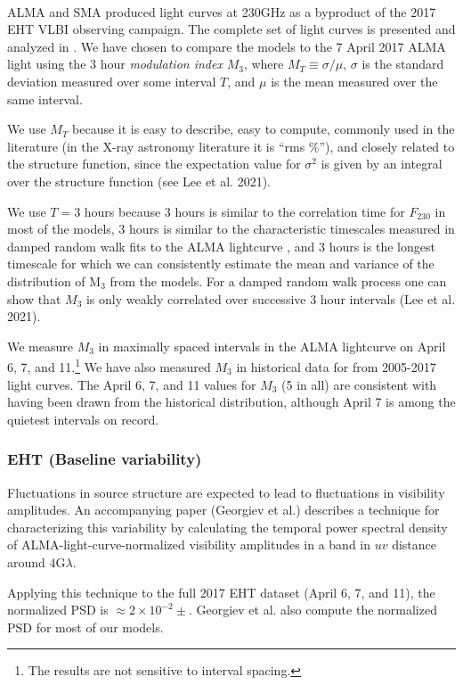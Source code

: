 \\
ALMA and SMA produced \sgra light curves at 230GHz as a byproduct of the 2017 EHT VLBI observing campaign. The complete set of light curves is presented and analyzed in \cite{wielgus2021}. We have chosen to compare the models to the 7 April 2017 ALMA light using
the 3 hour {\em modulation index} $M_3$, where $M_T \equiv
\sigma/\mu$, $\sigma$ is the standard deviation measured over some
interval $T$, and $\mu$ is the mean measured over the same interval.

We use $M_T$ because it is easy to describe, easy to compute, commonly used in the literature (in the X-ray astronomy literature it is ``rms \%''), and closely related to the structure function, since the expectation value for $\sigma^2$ is given by an integral over the structure function (see Lee et al. 2021).

We use $T = 3$ hours because 3 hours is similar to the correlation time for $F_{230}$ in most of the models, 3 hours is similar to the characteristic timescales measured in damped random walk fits to the ALMA lightcurve \citep[see Table 10 of][]{wielgus2021}, and 3 hours is the longest timescale for which we can consistently estimate the mean and variance of the distribution of M$_3$ from the models.  For a damped random walk process one can show that $M_3$ is only weakly correlated over successive 3 hour intervals (Lee et al. 2021).

We measure $M_3$ in maximally spaced intervals in the ALMA lightcurve on April 6, 7, and 11.\footnote{The results are not sensitive to interval spacing.}  We have also measured $M_3$ in historical data for \sgra from 2005-2017 light curves.  The April 6, 7, and 11 values for $M_3$ (5 in all) are consistent with having been drawn from the historical distribution, although April 7 is among the quietest intervals on record.  


\subsubsection{EHT (Baseline variability)}


Fluctuations in source structure are expected to lead to fluctuations in visibility amplitudes.  An accompanying paper  (Georgiev et al.) describes a technique for characterizing this variability by calculating the temporal power spectral density of ALMA-light-curve-normalized visibility amplitudes in a band in $uv$ distance around $4$G$\lambda$.

Applying this technique to the full 2017 EHT dataset (April 6, 7, and 11), the normalized PSD is $\approx 2 \times 10^{-2} \pm $.
Georgiev et al. also compute the normalized PSD for most of our models.  
